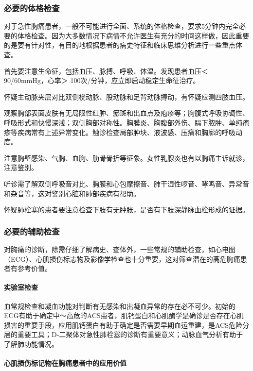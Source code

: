\subsubsection{必要的体格检查}

对于急性胸痛患者，一般不可能进行全面、系统的体格检查，要求5分钟内完全必要的体格检查。因为大多数情况下病情不允许医生有充分的时间这样做，因此重要的是要有针对性，有目的地根据患者的病史特征和临床思维分析进行一些重点体查。

首先要注意生命征，包括血压、脉搏、呼吸、体温。发现患者血压＜
90/60mmHg，心率＞ 100次/分钟，应立即启动稳定生命征治疗。

怀疑主动脉夹层对比双侧桡动脉、股动脉和足背动脉搏动，有怀疑应测四肢血压。

观察胸部表面皮肤有无局限性红肿、瘀斑和出血点及疱疹等；胸腹式呼吸协调性、呼吸形式和快慢深浅；双侧胸部对称性。胸膜炎、胸腹部外伤、膈下脓肿、单纯疱疹等疾病常有上述异常变化。触诊检查局部肿块、液波感、压痛和胸廓的呼吸动度。

注意胸壁感染、气胸、血胸、肋骨骨折等征象。女性乳腺炎也有以胸痛主诉就诊，注意鉴别。

听诊需了解双侧呼吸音对比、胸膜和心包摩擦音、肺干湿性啰音、哮鸣音、异常音和杂音等，这对鉴别心脏和肺部疾病有帮助。

怀疑肺栓塞的患者要注意检查下肢有无肿胀，是否有下肢深静脉血栓形成的证据。

\subsubsection{必要的辅助检查}

对胸痛的诊断，除需仔细了解病史、查体外，一些常规的辅助检查，如心电图（ECG）、心肌损伤标志物及影像学检查也十分重要，这对筛查潜在的高危胸痛患者有参考价值。

\paragraph{实验室检查}

血常规检查和凝血功能对判断有无感染和出凝血异常的存在必不可少。初始的ECG有助于确定中～高危的ACS患者，肌钙蛋白和心肌酶学是确诊是否存在心肌损害的重要手段，应用肌钙蛋白有助于确定是否需要早期血运重建，是ACS危险分层的重要工具；D-二聚体对急性肺栓塞的诊断有重要意义；动脉血气分析有助于了解肺功能情况。

\paragraph{心肌损伤标记物在胸痛患者中的应用价值}

